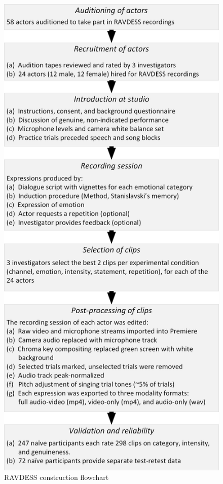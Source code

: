 \begin{figure}
        \centering
        \includegraphics[scale = 1.0]{images/RAVDESS_process.png}
        \caption{RAVDESS construction flowchart \cite{ravdess_journal}}
        \label{ravdessFlowchart}
\end{figure}


